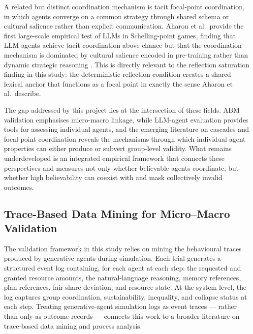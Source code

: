 \documentclass[11pt]{article}
\begin{document}
A related but distinct coordination mechanism is tacit focal-point coordination, in which
agents converge on a common strategy through shared schema or cultural salience rather than
explicit communication. Aharon et al.\ provide the first large-scale empirical test of LLMs
in Schelling-point games, finding that LLM agents achieve tacit coordination above chance
but that the coordination mechanism is dominated by cultural salience encoded in pre-training
rather than dynamic strategic reasoning \cite{aharon2026tacit}. This is directly relevant to
the reflection saturation finding in this study: the deterministic reflection condition creates
a shared lexical anchor that functions as a focal point in exactly the sense Aharon et al.\ describe.

The gap addressed by this project lies at the intersection of these fields. ABM validation
emphasises micro-macro linkage, while LLM-agent evaluation provides tools for assessing
individual agents, and the emerging literature on cascades and focal-point coordination
reveals the mechanisms through which individual agent properties can either produce or
subvert group-level validity. What remains underdeveloped is an integrated empirical
framework that connects these perspectives and measures not only whether believable agents
coordinate, but whether high believability can coexist with and mask collectively invalid outcomes.

\subsection{Trace-Based Data Mining for Micro--Macro Validation}
The validation framework in this study relies on mining the behavioural traces produced by
generative agents during simulation. Each trial generates a structured event log containing,
for each agent at each step: the requested and granted resource amounts, the natural-language
reasoning, memory references, plan references, fair-share deviation, and resource state. At
the system level, the log captures group coordination, sustainability, inequality, and
collapse status at each step. Treating generative-agent simulation logs as event traces ---
rather than only as outcome records --- connects this work to a broader literature on
trace-based data mining and process analysis.
\end{document}
